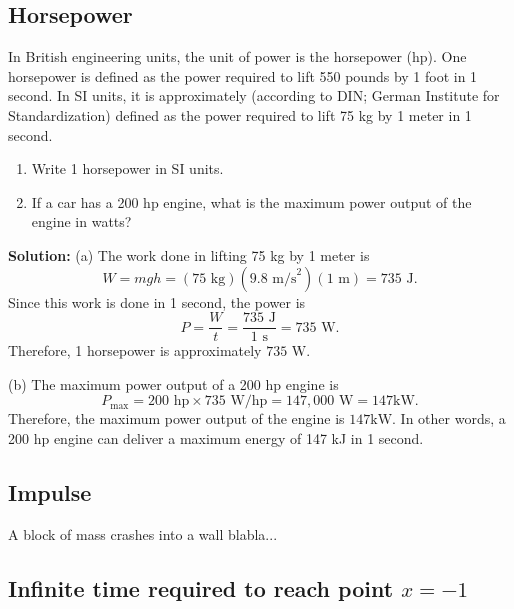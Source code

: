 \documentclass[../main.tex]{subfiles}
\begin{document}
\subsection{Horsepower}

In British engineering units, the unit of power is the horsepower (hp). One horsepower is defined as the power required to lift 550 pounds by 1 foot in 1 second. In SI units, it is approximately (according to DIN; German Institute for Standardization) defined as the power required to lift 75 kg by 1 meter in 1 second. 

\begin{enumerate}
    \item[(a)] Write 1 horsepower in SI units.
    \item[(b)] If a car has a 200 hp engine, what is the maximum power output of the engine in watts?
\end{enumerate}

\textbf{Solution:}
(a) The work done in lifting 75 kg by 1 meter is
\begin{equation}
W = mgh = (75 \text{ kg})(9.8 \text{ m/s}^2)(1 \text{ m}) = 735 \text{ J}. 
\end{equation}
Since this work is done in 1 second, the power is
\begin{equation}
P = \frac{W}{t} = \frac{735 \text{ J}}{1 \text{ s}} = 735 \text{ W}.
\end{equation}
Therefore, 1 horsepower is approximately $\boxed{735 \text{ W}}$.

(b) The maximum power output of a 200 hp engine is
\begin{equation}
P_{\text{max}} = 200 \text{ hp} \times 735 \text{ W/hp} = 147,000 \text{ W} = 147 \text{kW}.
\end{equation}
Therefore, the maximum power output of the engine is $\boxed{147 \text{kW}}$. In other words, a 200 hp engine can deliver a maximum energy of 147 kJ in 1 second.



\subsection{Impulse}
A block of mass crashes into a wall blabla...



\subsection{Infinite time required to reach point $x=-1$}
\end{document}
